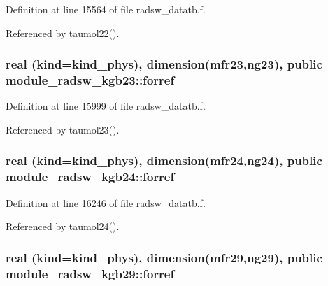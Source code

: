 Definition at line 15564 of file radsw\+\_\+datatb.\+f.



Referenced by taumol22().

\subsubsection[{\texorpdfstring{forref}{forref}}]{\setlength{\rightskip}{0pt plus 5cm}real (kind=kind\+\_\+phys), dimension(mfr23,ng23), public module\+\_\+radsw\+\_\+kgb23\+::forref}\hypertarget{group__module__radsw__main_ga18fabad311919ee30b2d367fbe250bcc}{}\label{group__module__radsw__main_ga18fabad311919ee30b2d367fbe250bcc}


Definition at line 15999 of file radsw\+\_\+datatb.\+f.



Referenced by taumol23().

\subsubsection[{\texorpdfstring{forref}{forref}}]{\setlength{\rightskip}{0pt plus 5cm}real (kind=kind\+\_\+phys), dimension(mfr24,ng24), public module\+\_\+radsw\+\_\+kgb24\+::forref}\hypertarget{group__module__radsw__main_gac57357ab300edcbad8f7b3801b796af3}{}\label{group__module__radsw__main_gac57357ab300edcbad8f7b3801b796af3}


Definition at line 16246 of file radsw\+\_\+datatb.\+f.



Referenced by taumol24().

\subsubsection[{\texorpdfstring{forref}{forref}}]{\setlength{\rightskip}{0pt plus 5cm}real (kind=kind\+\_\+phys), dimension(mfr29,ng29), public module\+\_\+radsw\+\_\+kgb29\+::forref}\hypertarget{group__module__radsw__main_ga6e4d495b4588d3c794047e71497661a0}{}\label{group__module__radsw__main_ga6e4d495b4588d3c794047e71497661a0}



